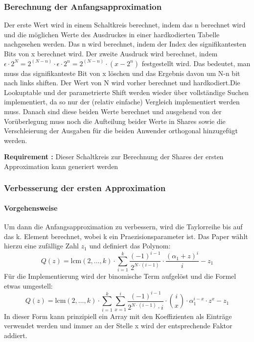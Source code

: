 \documentclass{article}
\newcounter{requirementscount}{}
\newcommand{\requirement}[1] {
        \addtocounter{requirementscount}{1}
        {\bf Requirement \therequirementscount:} #1\\
    }
\begin{document}
\subsubsection{Berechnung der Anfangsapproximation}
Der erste Wert wird in einem Schaltkreis berechnet, indem das n berechnet wird
und die m\"oglichen Werte des Ausdruckes in einer hardkodierten Tabelle
nachgesehen werden. Das n wird berechnet, indem der Index des signifikantesten
Bits von x berechnet wird. Der zweite Ausdruck wird berechnet, indem 
\(\epsilon \cdot 2^N = 2^(N-n) \cdot \epsilon \cdot 2^n = 2^(N-n) \cdot (x - 2^n)\) 
festgestellt wird. Das bedeutet, man muss das signifikanteste Bit von x 
l\"oschen und das Ergebnis davon um N-n bit nach links shiften. Der Wert
von N wird vorher berechnet und hardkodiert.Die Lookuptable und der 
parametrierte Shift werden wieder \"uber vollst\"andige Suchen implementiert,
da so nur der (relativ einfache) Vergleich implementiert werden muss.
Danach sind diese beiden Werte berechnet und ausgehend von der Vor\"uberlegung
muss noch die Aufteilung beider Werte in Shares sowie die Verschleierung der
Ausgaben f\"ur die beiden Anwender orthogonal hinzugef\"ugt werden.\\
\requirement{Dieser Schaltkreis zur Berechnung der Shares der
ersten Approximation kann generiert werden}

\subsubsection{Verbesserung der ersten Approximation}
\paragraph{Vorgehensweise}
Um dann die Anfangsapproximation zu verbessern, wird die Taylorreihe bis auf
das k. Element berechnet, wobei k ein Praezisionsparameter ist. Das Paper
w\"ahlt hierzu eine zuf\"allige Zahl \(z_1\) und definiert das Polynom:
\begin{equation}
Q(z) = 
    \mathrm{lcm}(2,\dots,k)
    \cdot
    \sum_{i=1}^k 
    \frac{(-1)^{i-1}}{2^{N \cdot (i-1)}}
    \cdot
    \frac{(\alpha_1+z)^i}{i}
    - z_1
\end{equation}
F\"ur die Implementierung wird der binomische Term aufgel\"ost und die Formel
etwas umgestell:
\begin{equation}
Q(z) =
    \mathrm{lcm}(2, \dots, k)
    \cdot
    \sum
        _{
            i=1
        }
        ^k
    \sum
        _{
            x=1
        }
        ^i
    \frac
        {
            (-1)
                ^{
                    i-1
                }
        }
        {
            2
                ^{
                    N \cdot (i-1)
                }
            \cdot 
            i
        }
    \cdot
    {i \choose x}
    \cdot
    \alpha_1
        ^{i-x}
    \cdot
    z
        ^x
    - z_1
\end{equation}
In dieser Form kann prinzipiell ein Array mit den Koeffizienten als Eintr\"age
verwendet werden und immer an der Stelle x wird der entsprechende Faktor
addiert.
\end{document}
